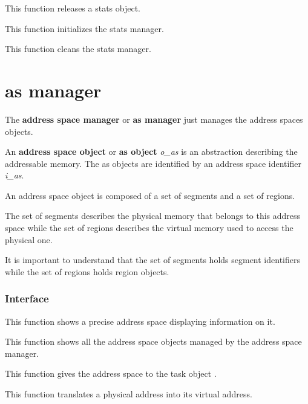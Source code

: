 	 {
	   This function releases a stats object.
	 }

	 {
	   This function initializes the stats manager.
	 }

	 {
	   This function cleans the stats manager.
	 }

%
%

\section{as manager}

The \textbf{address space manager} or \textbf{as manager} just manages
the address spaces objects.

An \textbf{address space object} or \textbf{as object} \textit{o\_as}
is an abstraction describing the addressable memory. The as objects
are identified by an address space identifier \textit{i\_as}.

An address space object is composed of a set of segments and a set of regions.

The set of segments describes the physical memory that belongs to this
address space while the set of regions describes the virtual memory
used to access the physical one.

It is important to understand that the set of segments holds segment
identifiers while the set of regions holds region objects.

%
%

\subsubsection{Interface}

	 {
	   This function shows a precise address space displaying
	   information on it.
	 }

	 {
	   This function shows all the address space objects managed by
	   the address space manager.
	 }

	 {
	   This function gives the address space  to the
	   task object .
	 }

	 {
	   This function translates a physical address into its virtual
	   address.
	 }

